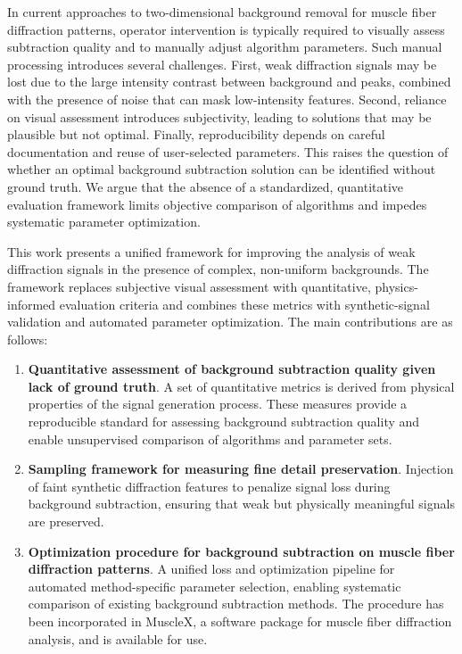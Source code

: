 \documentclass[iucr]{iucrjournals}
\begin{document}
In current approaches to two-dimensional background removal for muscle fiber diffraction patterns, operator intervention is typically required to visually assess subtraction quality and to manually adjust algorithm parameters. Such manual processing introduces several challenges. First, weak diffraction signals may be lost due to the large intensity contrast between background and peaks, combined with the presence of noise that can mask low-intensity features. Second, reliance on visual assessment introduces subjectivity, leading to solutions that may be plausible but not optimal. Finally, reproducibility depends on careful documentation and reuse of user-selected parameters. This raises the question of whether an optimal background subtraction solution can be identified without ground truth. We argue that the absence of a standardized, quantitative evaluation framework limits objective comparison of algorithms and impedes systematic parameter optimization.


This work presents a unified framework for improving the analysis of weak diffraction signals in the presence of complex, non-uniform backgrounds. The framework replaces subjective visual assessment with quantitative, physics-informed evaluation criteria and combines these metrics with synthetic-signal validation and automated parameter optimization. The main contributions are as follows:

\begin{enumerate}

\item \textbf{Quantitative assessment of background subtraction quality given lack of ground truth}. A set of quantitative metrics is derived from physical properties of the signal generation process. These measures provide a reproducible standard for assessing background subtraction quality and enable unsupervised comparison of algorithms and parameter sets.

\item \textbf{Sampling framework for measuring fine detail preservation}. Injection of faint synthetic diffraction features to penalize signal loss during background subtraction, ensuring that weak but physically meaningful signals are preserved.

\item \textbf{Optimization procedure for background subtraction on muscle fiber diffraction patterns}. A unified loss and optimization pipeline for automated method-specific parameter selection, enabling systematic comparison of existing background subtraction methods. The procedure has been incorporated in MuscleX, a software package for muscle fiber diffraction analysis, and is available for use.

\end{enumerate}
\end{document}
